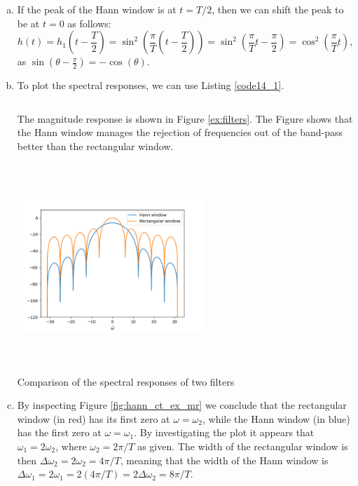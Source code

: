 \begin{enumerate}
\begin{enumerate}[a)]
\item If the peak of the Hann window is at $t=T/2$, then we can shift the peak to be at $t=0$ as follows:
$$h(t)=h_{1}\left(t-\frac{T}{2}\right)=\sin^{2}\left(\frac{\pi}{T}\left(t-\frac{T}{2}\right)\right)=\sin^{2}\left(\frac{\pi}{T}t-\frac{\pi}{2}\right)=\cos^{2}\left(\frac{\pi}{T}t\right),$$
as $\sin\left(\theta-\frac{\pi}{2}\right)=-\cos(\theta)$. 

\item To plot the spectral responses, we can use Listing \ref{code14_1}.
\begin{lstlisting}[language=Python, caption=Filter spectral response,label=code14_1]

\end{lstlisting}



The magnitude response is shown in Figure \ref{ex:filters}. The Figure shows that the Hann window manages the 
rejection of frequencies out of the band-pass better than the rectangular window. 
\begin{marginfigure}
    \includegraphics[width=7.0cm,height=7.5cm]{ch14/figures/filters.png}
    \caption{Comparison of the spectral responses of two filters}
    \label{ex:filters}
\end{marginfigure}

\item By inspecting Figure \ref{fig:hann_ct_ex_mr} we conclude that the rectangular window (in red) 
has its first zero at $\omega=\omega_{2}$, while the Hann window (in blue) has the first zero at $\omega=\omega_{1}$. 
By investigating the plot it appears that $\omega_{1}=2\omega_{2}$, where $\omega_{2}=2\pi /T$ as given. 
The width of the rectangular window is then $\Delta\omega_{2}=2\omega_{2}=4\pi/T$, meaning that the 
width of the Hann window is $\Delta\omega_{1}=2\omega_{1}=2(4\pi/T)=2\Delta\omega_{2}=8\pi /T$. 


\end{enumerate}
\end{enumerate}
